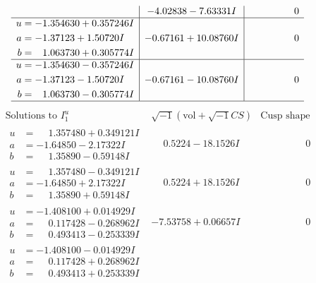 \documentclass[1p]{elsarticle_modified}
\theoremstyle{definition}
\newcommand{\I}{\sqrt{-1}}
\begin{document}
$$\begin{array}{c|c|c}
 & -4.02838 - 7.63331 I & \phantom{-0.000000 } 0 \\ \hline\begin{aligned}
u &= -1.354630 + 0.357246 I \\
a &= -1.37123 + 1.50720 I \\
b &= \phantom{-}1.063730 + 0.305774 I\end{aligned}
 & -0.67161 + 10.08760 I & \phantom{-0.000000 } 0 \\ \hline\begin{aligned}
u &= -1.354630 - 0.357246 I \\
a &= -1.37123 - 1.50720 I \\
b &= \phantom{-}1.063730 - 0.305774 I\end{aligned}
 & -0.67161 - 10.08760 I & \phantom{-0.000000 } 0\\
 \hline 
 \end{array}$$\newpage$$\begin{array}{c|c|c}  
\text{Solutions to }I^u_{1}& \I (\text{vol} + \sqrt{-1}CS) & \text{Cusp shape}\\
 \hline 
\begin{aligned}
u &= \phantom{-}1.357480 + 0.349121 I \\
a &= -1.64850 - 2.17322 I \\
b &= \phantom{-}1.35890 - 0.59148 I\end{aligned}
 & \phantom{-}0.5224 - 18.1526 I & \phantom{-0.000000 } 0 \\ \hline\begin{aligned}
u &= \phantom{-}1.357480 - 0.349121 I \\
a &= -1.64850 + 2.17322 I \\
b &= \phantom{-}1.35890 + 0.59148 I\end{aligned}
 & \phantom{-}0.5224 + 18.1526 I & \phantom{-0.000000 } 0 \\ \hline\begin{aligned}
u &= -1.408100 + 0.014929 I \\
a &= \phantom{-}0.117428 - 0.268962 I \\
b &= \phantom{-}0.493413 - 0.253339 I\end{aligned}
 & -7.53758 + 0.06657 I & \phantom{-0.000000 } 0 \\ \hline\begin{aligned}
u &= -1.408100 - 0.014929 I \\
a &= \phantom{-}0.117428 + 0.268962 I \\
b &= \phantom{-}0.493413 + 0.253339 I\end{aligned}

\end{array}$$
\end{document}
